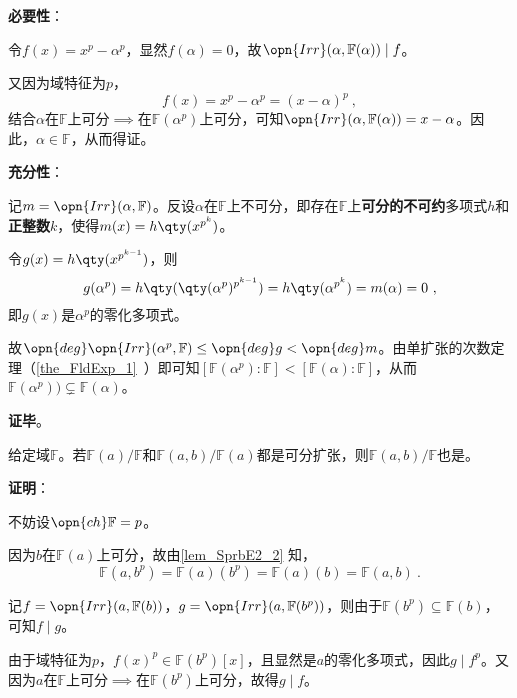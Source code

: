 \textbf{必要性}：

令$f(x)=x^p-\alpha^p$，显然$f(\alpha)=0$，故$\opn{Irr}(\alpha, \mathbb{F}(\alpha))\mid f$。

又因为域特征为$p$，
\begin{equation}
    f(x) = x^p-\alpha^p = (x-\alpha)^p~,
\end{equation}
结合$\alpha$在$\mathbb{F}$上可分$\implies$在$\mathbb{F}(\alpha^p)$上可分，可知$\opn{Irr}(\alpha, \mathbb{F}(\alpha))=x-\alpha$。因此，$\alpha\in\mathbb{F}$，从而得证。

\textbf{充分性}：

记$m=\opn{Irr}(\alpha, \mathbb{F})$。反设$\alpha$在$\mathbb{F}$上不可分，即存在$\mathbb{F}$上\textbf{可分的不可约}多项式$h$和\textbf{正整数}$k$，使得$m(x)=h\qty(x^{p^k})$。

令$g(x)=h\qty(x^{p^{k-1}})$，则
\begin{equation}
    g(\alpha^p)= h\qty(\qty(\alpha^{p})^{p^{k-1}}) = h\qty(\alpha^{p^k}) = m(\alpha) = 0~,
\end{equation}
即$g(x)$是$\alpha^p$的零化多项式。

故$\opn{deg}\opn{Irr}(\alpha^p, \mathbb{F})\leq \opn{deg}g< \opn{deg}m$。由单扩张的次数定理（\autoref{the_FldExp_1}~）即可知$[\mathbb{F}(\alpha^p):\mathbb{F}]<[\mathbb{F}(\alpha):\mathbb{F}]$，从而$\mathbb{F}(\alpha^p))\subsetneq\mathbb{F}(\alpha)$。

\textbf{证毕}。





\begin{lemma}{}
给定域$\mathbb{F}$。若$\mathbb{F}(a)/\mathbb{F}$和$\mathbb{F}(a, b)/\mathbb{F}(a)$都是可分扩张，则$\mathbb{F}(a, b)/\mathbb{F}$也是。
\end{lemma}

\textbf{证明}：

不妨设$\opn{ch}\mathbb{F}=p$。

因为$b$在$\mathbb{F}(a)$上可分，故由\autoref{lem_SprbE2_2} 知，
\begin{equation}\label{eq_SprbE2_1}
    \mathbb{F}(a, b^p) = \mathbb{F}(a)(b^p) = \mathbb{F}(a)(b) = \mathbb{F}(a, b)~.
\end{equation}




记$f=\opn{Irr}(a, \mathbb{F}(b))$，$g=\opn{Irr}(a, \mathbb{F}(b^p))$，则由于$\mathbb{F}(b^p)\subseteq\mathbb{F}(b)$，可知$f\mid g$。

由于域特征为$p$，$f(x)^p\in\mathbb{F}(b^p)[x]$，且显然是$a$的零化多项式，因此$g\mid f^p$。又因为$a$在$\mathbb{F}$上可分$\implies$在$\mathbb{F}(b^p)$上可分，故得$g\mid f$。

